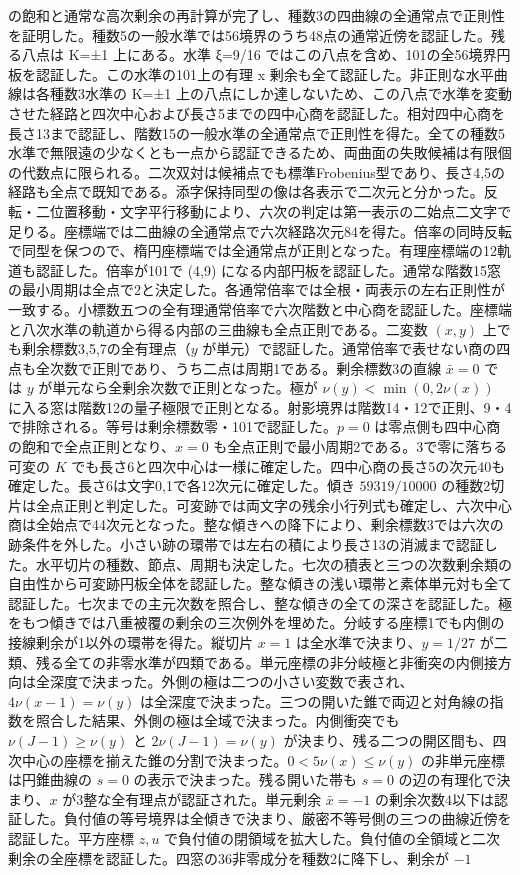 \documentclass[11pt,a4paper]{ltjsarticle}
\begin{document}
の飽和と通常な高次剰余の再計算が完了し、種数3の四曲線の全通常点で正則性を証明した。種数5の一般水準では56境界のうち48点の通常近傍を認証した。残る八点は K=±1 上にある。水準 ξ=9/16 ではこの八点を含め、101の全56境界円板を認証した。この水準の101上の有理 x 剰余も全て認証した。非正則な水平曲線は各種数3水準の K=±1 上の八点にしか達しないため、この八点で水準を変動させた経路と四次中心および長さ5までの四中心商を認証した。相対四中心商を長さ13まで認証し、階数15の一般水準の全通常点で正則性を得た。全ての種数5水準で無限遠の少なくとも一点から認証できるため、両曲面の失敗候補は有限個の代数点に限られる。二次双対は候補点でも標準Frobenius型であり、長さ4,5の経路も全点で既知である。添字保持同型の像は各表示で二次元と分かった。反転・二位置移動・文字平行移動により、六次の判定は第一表示の二始点二文字で足りる。座標端では二曲線の全通常点で六次経路次元84を得た。倍率の同時反転で同型を保つので、楕円座標端では全通常点が正則となった。有理座標端の12軌道も認証した。倍率が101で (4,9) になる内部円板を認証した。通常な階数15窓の最小周期は全点で2と決定した。各通常倍率では全根・両表示の左右正則性が一致する。小標数五つの全有理通常倍率で六次階数と中心商を認証した。座標端と八次水準の軌道から得る内部の三曲線も全点正則である。二変数 $(x,y)$ 上でも剰余標数3,5,7の全有理点（$y$ が単元）で認証した。通常倍率で表せない商の四点も全次数で正則であり、うち二点は周期1である。剰余標数3の直線 $\bar x=0$ では $y$ が単元なら全剰余次数で正則となった。極が $\nu(y)<\min(0,2\nu(x))$ に入る窓は階数12の量子極限で正則となる。射影境界は階数14・12で正則、9・4で排除される。等号は剰余標数零・101で認証した。$p=0$ は零点側も四中心商の飽和で全点正則となり、$x=0$ も全点正則で最小周期2である。3で零に落ちる可変の $K$ でも長さ6と四次中心は一様に確定した。四中心商の長さ5の次元40も確定した。長さ6は文字0,1で各12次元に確定した。傾き $59319/10000$ の種数2切片は全点正則と判定した。可変跡では両文字の残余小行列式も確定し、六次中心商は全始点で44次元となった。整な傾きへの降下により、剰余標数3では六次の跡条件を外した。小さい跡の環帯では左右の積により長さ13の消滅まで認証した。水平切片の種数、節点、周期も決定した。七次の積表と三つの次数剰余類の自由性から可変跡円板全体を認証した。整な傾きの浅い環帯と素体単元対も全て認証した。七次までの主元次数を照合し、整な傾きの全ての深さを認証した。極をもつ傾きでは八重被覆の剰余の三次例外を埋めた。分岐する座標1でも内側の接線剰余が1以外の環帯を得た。縦切片 $x=1$ は全水準で決まり、$y=1/27$ が二類、残る全ての非零水準が四類である。単元座標の非分岐極と非衝突の内側接方向は全深度で決まった。外側の極は二つの小さい変数で表され、$4\nu(x-1)=\nu(y)$ は全深度で決まった。三つの開いた錐で両辺と対角線の指数を照合した結果、外側の極は全域で決まった。内側衝突でも $\nu(J-1)\ge\nu(y)$ と $2\nu(J-1)=\nu(y)$ が決まり、残る二つの開区間も、四次中心の座標を揃えた錐の分割で決まった。$0<5\nu(x)\le\nu(y)$ の非単元座標は円錐曲線の $s=0$ の表示で決まった。残る開いた帯も $s=0$ の辺の有理化で決まり、$x$ が3整な全有理点が認証された。単元剰余 $\bar x=-1$ の剰余次数4以下は認証した。負付値の等号境界は全傾きで決まり、厳密不等号側の三つの曲線近傍を認証した。平方座標 $z,u$ で負付値の閉領域を拡大した。負付値の全領域と二次剰余の全座標を認証した。四窓の36非零成分を種数2に降下し、剰余が $-1$ 
\end{document}

